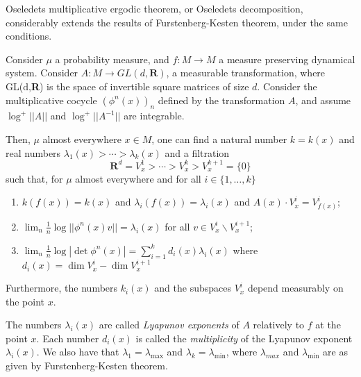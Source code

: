\documentclass[12pt]{article}
\begin{document}
Oseledets multiplicative ergodic theorem, or Oseledets decomposition, considerably extends the results of Furstenberg-Kesten theorem, under the same conditions.

Consider $\mu$ a probability measure, and $f:M\rightarrow M$ a measure preserving dynamical system. Consider $A:M\rightarrow GL(d,\textbf{R})$, a measurable transformation, where GL(d,\textbf{R}) is the space of invertible square matrices of size $d$.
Consider the multiplicative cocycle $(\phi^n(x))_n$ defined by the transformation $A$, and assume $\log^+||A||$ and $\log^+||A^{-1}||$ are integrable.

Then, $\mu$ almost everywhere $x \in M$, one can find a natural number $k=k(x)$ and real numbers $\lambda_1(x)> \cdots > \lambda_k(x)$ and a filtration
$$\textbf{R}^d=V_x^1 > \cdots > V_x^k > V_x^{k+1} = \{0\}$$
such that, for $\mu$ almost everywhere and for all $i \in \{1,\dots, k\}$
\begin{enumerate}
\item $k(f(x))=k(x)$ and $\lambda_i(f(x))=\lambda_i(x)$ and $A(x) \cdot V_x^i=V_{f(x)}^i$;
\item $\lim_n \frac{1}{n} \log ||\phi^n(x)v||=\lambda_i(x)$ for all $v \in V_x^i \backslash V_x^{i+1}$;
\item $\lim_n \frac{1}{n} \log |\det \phi^n(x)|=\sum_{i=1}^k d_i(x)\lambda_i(x)$ where $d_i(x)=\dim V_x^i-\dim V_x^{i+1}$
\end{enumerate}
Furthermore, the numbers $k_i(x)$ and the subspaces $V_x^i$ depend measurably on the point $x$.

The numbers $\lambda_i(x)$ are called \textit{Lyapunov exponents} of $A$ relatively to $f$ at the point $x$. Each number $d_i(x)$ is called the \textit{multiplicity} of the Lyapunov exponent $\lambda_i(x)$. We also have that $\lambda_1=\lambda_{\max}$ and $\lambda_k=\lambda_{\min}$, where $\lambda_{max}$ and $\lambda_{\min}$ are as given by Furstenberg-Kesten theorem.
\end{document}
